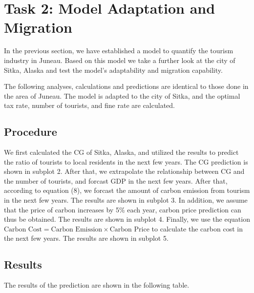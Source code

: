 \section{Task 2: Model Adaptation and Migration}

In the previous section, we have established a model to quantify 
the tourism industry in Juneau. 
Based on this model we take a further look at the city of Sitka, Alaska and
test the model's adaptability and migration capability.

The following analyses, calculations and predictions are identical to those done
in the area of Juneau. The model is adapted to the city of Sitka, and the optimal tax rate, number of tourists, and fine rate are calculated.

\subsection{Procedure}

We first calculated the CG of Sitka, Alaska, and utilized the results
to predict the ratio of tourists to local residents in the next few years.
The CG prediction is shown in subplot 2. After that, we extrapolate the relationship
between CG and the number of tourists, and forcast GDP in the next few years.
After that, according to equation (8), we forcast the amount of carbon emission
from tourism in the next few years. The results are shown in subplot 3. In addition, 
we assume that the price of carbon increases by 5\% each year, carbon price prediction 
can thus be obtained. The results are shown in subplot 4. Finally, we use the equation
$\text{Carbon Cost} = \text{Carbon Emission} \times \text{Carbon Price}$ to calculate the
carbon cost in the next few years. The results are shown in subplot 5.

\subsection{Results}

The results of the prediction are shown in the following table.

